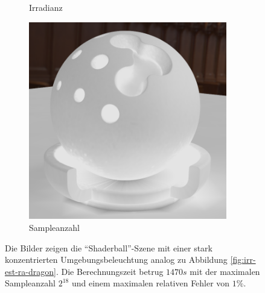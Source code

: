 \begin{figure}[h]
\begin{subfigure}[t]{0.33\textwidth}
				\caption{Irradianz}
			\end{subfigure}
			\begin{subfigure}[t]{0.33\textwidth}
				\center
				\includegraphics[width=0.95\textwidth]{pic/irr_est-ra-shaderball4-scount.png}
				\caption{Sampleanzahl}
			\end{subfigure}
			\caption[Vierte adaptive Vertex-Irradiance-Map anhand der \enquote{Shaderball}-Szene]{Die Bilder zeigen die \enquote{Shaderball}-Szene mit einer stark konzentrierten Umgebungsbeleuchtung analog zu Abbildung \ref{fig:irr-est-ra-dragon}. Die Berechnungszeit betrug $1470\unit{s}$ mit der maximalen Sampleanzahl $2^{18}$ und einem maximalen relativen Fehler von $1\unit{\%}$.}
			\label{fig:irr-est-ra-shaderball4}
		\end{figure}

		\FloatBarrier


